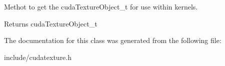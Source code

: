 Methot to get the cuda\+Texture\+Object\+\_\+t for use within kernels. 

\begin{DoxyReturn}{Returns}
cuda\+Texture\+Object\+\_\+t 
\end{DoxyReturn}


The documentation for this class was generated from the following file\+:\begin{DoxyCompactItemize}
\item 
include/cudatexture.\+h\end{DoxyCompactItemize}
